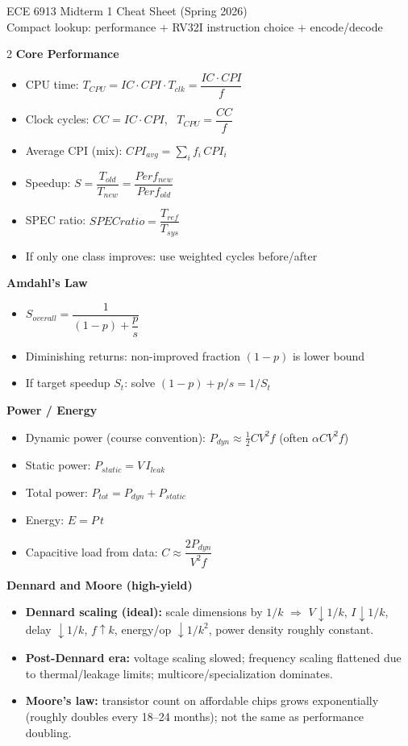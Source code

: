 \documentclass[10pt]{article}
\newcommand{\hdr}[1]{\vspace{2pt}\textbf{#1}\vspace{1pt}\\}
\begin{document}
\footnotesize
\begin{center}
{\Large ECE 6913 Midterm 1 Cheat Sheet (Spring 2026)}\\[-2pt]
\small Compact lookup: performance + RV32I instruction choice + encode/decode
\end{center}

\begin{multicols}{2}
\hdr{Core Performance}
\begin{itemize}
\item CPU time: $T_{CPU}=IC\cdot CPI\cdot T_{clk}=\dfrac{IC\cdot CPI}{f}$
\item Clock cycles: $CC=IC\cdot CPI$, \, $T_{CPU}=\dfrac{CC}{f}$
\item Average CPI (mix): $CPI_{avg}=\sum_i f_i\,CPI_i$
\item Speedup: $S=\dfrac{T_{old}}{T_{new}}=\dfrac{Perf_{new}}{Perf_{old}}$
\item SPEC ratio: $SPECratio=\dfrac{T_{ref}}{T_{sys}}$
\item If only one class improves: use weighted cycles before/after
\end{itemize}

\hdr{Amdahl's Law}
\begin{itemize}
\item $S_{overall}=\dfrac{1}{(1-p)+\dfrac{p}{s}}$
\item Diminishing returns: non-improved fraction $(1-p)$ is lower bound
\item If target speedup $S_t$: solve $(1-p)+p/s=1/S_t$
\end{itemize}

\hdr{Power / Energy}
\begin{itemize}
\item Dynamic power (course convention): $P_{dyn}\approx \tfrac12 C V^2 f$ (often $\alpha C V^2 f$)
\item Static power: $P_{static}=V\,I_{leak}$
\item Total power: $P_{tot}=P_{dyn}+P_{static}$
\item Energy: $E=P\,t$
\item Capacitive load from data: $C\approx \dfrac{2P_{dyn}}{V^2 f}$
\end{itemize}

\hdr{Dennard and Moore (high-yield)}
\begin{itemize}
\item \textbf{Dennard scaling (ideal):} scale dimensions by $1/k$ $\Rightarrow$ $V\downarrow 1/k$, $I\downarrow 1/k$, delay $\downarrow 1/k$, $f\uparrow k$, energy/op $\downarrow 1/k^2$, power density roughly constant.
\item \textbf{Post-Dennard era:} voltage scaling slowed; frequency scaling flattened due to thermal/leakage limits; multicore/specialization dominates.
\item \textbf{Moore's law:} transistor count on affordable chips grows exponentially (roughly doubles every 18--24 months); not the same as performance doubling.
\end{itemize}


\end{multicols}
\end{document}

